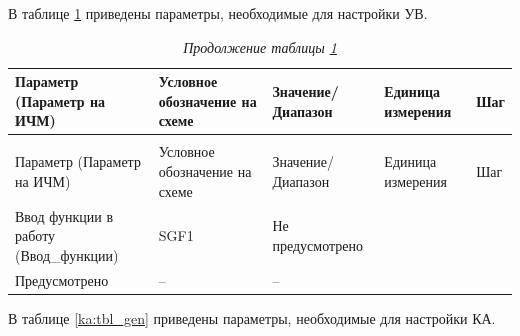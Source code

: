 \par
В таблице \ref{uv:tbl_gen} приведены параметры, необходимые для настройки УВ. 

\footnotesize
\begin{longtable}{|>{\centering\arraybackslash}m{5.3cm}|>{\centering\arraybackslash}m{3.3cm}|>{\centering\arraybackslash}m{4.2cm}|>{\centering\arraybackslash}m{1.8cm}|>{\centering\arraybackslash}m{1cm}|}
\caption{Параметры для настройки УВ\hfill\vspace{-0.5\baselineskip}}\label{uv:tbl_gen}\\ 
\hline
\rowcolor{gray!20}
Параметр (Параметр на ИЧМ) & Условное обозначение на схеме & Значение/ Диапазон & Единица измерения & Шаг \\ 
\hline
\endfirsthead
\caption*{\hspace{3pt}\emph{Продолжение таблицы \ref{uv:tbl_gen}\hfill\vspace{-0.5\baselineskip}}} \\ %
\hline
\rowcolor{gray!20}
Параметр (Параметр на ИЧМ) & Условное обозначение на схеме & Значение/ Диапазон & Единица измерения & Шаг \\ 
\endhead
\endfoot
\endlastfoot
\centering Ввод функции в работу (Ввод\_функции)  & \centering SGF1 & \centering Не предусмотрено \\ Предусмотрено & \centering -- & \centering \arraybackslash -- \\
\hline
\end{longtable}
\normalsize


\par
В таблице \ref{ka:tbl_gen} приведены параметры, необходимые для настройки КА.

